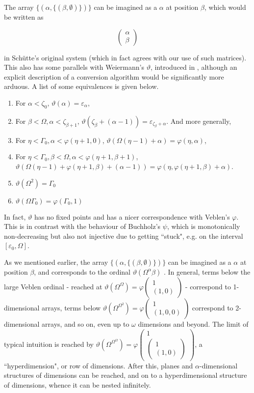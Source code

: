 \documentclass{article}
\theoremstyle{definition}
\theoremstyle{plain}
\theoremstyle{plain}
\theoremstyle{plain}
\theoremstyle{plain}
\theoremstyle{remark}
\theoremstyle{remark}
\theoremstyle{remark}
\theoremstyle{plain}
\theoremstyle{plain}
\newcommand{\at}[2]{\begin{matrix}#1\\#2\end{matrix}}
\begin{document}
The array $\{(\alpha,\{(\beta,\emptyset)\})\}$ can be imagined as a $\alpha$ at position $\beta$, which would be written as

\begin{equation}
\left(\begin{matrix}\alpha\\\beta\end{matrix}\right)
\end{equation}

in Schütte's original system (which in fact agrees with our use of such matrices). This also has some parallels with Weiermann's $\vartheta$, introduced in \cite{rathjen}, although an explicit description of a conversion algorithm would be significantly more arduous. A list of some equivalences is given below. 
\begin{enumerate}
    \item For $\alpha < \zeta_0$, $\vartheta(\alpha) = \varepsilon_\alpha$,
    \item For $\beta < \Omega, \alpha < \zeta_{\beta+1}$, $\vartheta(\zeta_\beta+(\alpha-1)) = \varepsilon_{\zeta_\beta+\alpha}$. 
    And more generally,
    \item For $\eta < \Gamma_0, \alpha < \varphi(\eta+1,0)$, $\vartheta(\Omega(\eta-1)+\alpha) = \varphi(\eta,\alpha)$,
    \item For $\eta < \Gamma_0, \beta < \Omega, \alpha < \varphi(\eta+1,\beta+1)$, $\vartheta(\Omega(\eta-1)+\varphi(\eta+1,\beta)+(\alpha-1)) = \varphi(\eta,\varphi(\eta+1,\beta)+\alpha)$.
    \item $\vartheta(\Omega^2) = \Gamma_0$
    \item $\vartheta(\Omega \Gamma_0) = \varphi(\Gamma_0,1)$
\end{enumerate}

In fact, $\vartheta$ has no fixed points and has a nicer correspondence with Veblen's $\varphi$. This is in contrast with the behaviour of Buchholz's $\psi$, which is monotonically non-decreasing but also not injective due to getting ``stuck", e.g. on the interval $[\varepsilon_0, \Omega]$.

As we mentioned earlier, the array $\{(\alpha,\{(\beta,\emptyset)\})\}$ can be imagined as a $\alpha$ at position $\beta$, and corresponds to the ordinal $\vartheta(\Omega^\alpha \beta)$ . In general, terms below the large Veblen ordinal - reached at $\vartheta(\Omega^\Omega) = \varphi\left(\at{1}{(1,0)}\right)$ - correspond to 1-dimensional arrays, terms below $\vartheta(\Omega^{\Omega^2}) = \varphi\left(\at{1}{(1,0,0)}\right)$ correspond to 2-dimensional arrays, and so on, even up to $\omega$ dimensions and beyond. The limit of typical intuition is reached by $\vartheta(\Omega^{\Omega^\Omega}) = \varphi\left(\at{1}{\left(\at{1}{(1,0)}\right)}\right)$, a ``hyperdimension", or row of dimensions. After this, planes and $\alpha$-dimensional structures of dimensions can be reached, and on to a hyperdimensional structure of dimensions, whence it can be nested infinitely.
\end{document}

